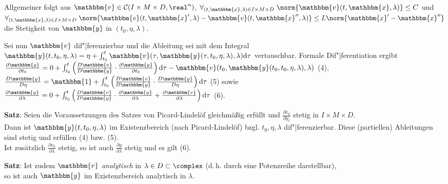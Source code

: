 Allgemeiner folgt aus
$\mathbbm{v} \in \C(I \times M \times D, \real^n)$,
$\forall_{(t, \mathbbm{x}, \lambda) \in I \times M \times D}\;
\norm{\mathbbm{v}(t, \mathbbm{x}, \lambda)} \le C$ und \\
$\forall_{(t, \mathbbm{x}, \lambda) \in I \times M \times D}\;
\norm{\mathbbm{v}(t, \mathbbm{x}', \lambda) -
\mathbbm{v}(t, \mathbbm{x}'', \lambda)} \le
L \norm{\mathbbm{x}' - \mathbbm{x}''}$
die Stetigkeit von $\mathbbm{y}$ in $(t_0, \eta, \lambda)$.

\linie

Sei nun $\mathbbm{v}$ dif"|ferenzierbar und die Ableitung sei mit dem
Integral \\
$\mathbbm{y}(t, t_0, \eta, \lambda) =
\eta + \int_{t_0}^t
\mathbbm{v}(\tau, \mathbbm{y}(\tau, t_0, \eta, \lambda), \lambda) \d\tau$
vertauschbar.
Formale Dif"|ferentiation ergibt \\
$\frac{\partial \mathbbm{y}}{\partial t_0} = 0 +
\int_{t_0}^t \left(\frac{D \mathbbm{v}}{D \mathbbm{y}} \cdot
\frac{\partial \mathbbm{y}}{\partial t_0}\right) \d\tau -
\mathbbm{v}(t_0, \mathbbm{y}(t_0, t_0, \eta, \lambda), \lambda)$ (4), \\
$\frac{D \mathbbm{y}}{D \eta} = \mathbbm{1} +
\int_{t_0}^t \left(\frac{D \mathbbm{v}}{D \mathbbm{y}} \cdot
\frac{D \mathbbm{y}}{D \eta}\right) \d\tau$ (5) sowie \\
$\frac{\partial \mathbbm{y}}{\partial \lambda} = 0 +
\int_{t_0}^t \left(\frac{D \mathbbm{v}}{D \mathbbm{y}} \cdot
\frac{\partial \mathbbm{y}}{\partial \lambda} +
\frac{\partial \mathbbm{v}}{\partial \lambda} \right) \d\tau$ (6).

\textbf{Satz}:
Seien die Voraussetzungen des Satzes von Picard-Lindelöf gleichmäßig
erfüllt und $\frac{\partial v_k}{\partial y_\ell}$ stetig in
$I \times M \times D$. \\
Dann ist $\mathbbm{y}(t, t_0, \eta, \lambda)$ im Existenzbereich
(nach Picard-Lindelöf) bzgl. $t_0, \eta, \lambda$ dif"|ferenzierbar.
Diese (partiellen) Ableitungen sind stetig und erfüllen (4) bzw. (5). \\
Ist zusätzlich $\frac{\partial v_k}{\partial \lambda}$ stetig, so ist auch
$\frac{\partial y}{\partial \lambda}$ stetig und es gilt (6).

\textbf{Satz}:
Ist zudem $\mathbbm{v}$ \emph{analytisch} in $\lambda \in D \subset \complex$
(d.\,h. durch eine Potenzreihe darstellbar), \\
so ist auch $\mathbbm{y}$ im Existenzbereich analytisch in $\lambda$.


